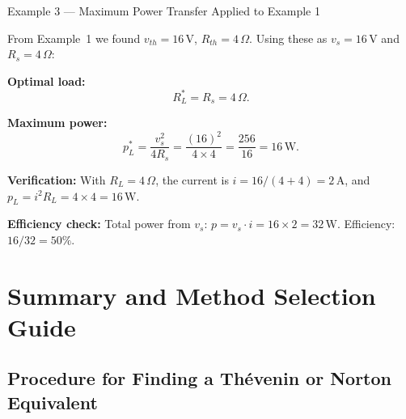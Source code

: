 \documentclass[twoside]{article}
\begin{document}
\begin{greenbox}{}{Example 3 — Maximum Power Transfer Applied to Example 1}

From Example~1 we found $v_{th} = 16\,\mathrm{V}$, $R_{th} = 4\,\Omega$.  Using these as $v_s = 16\,\mathrm{V}$ and $R_s = 4\,\Omega$:

\textbf{Optimal load:}
\[
    R_L^{*} = R_s = 4\,\Omega.
\]

\textbf{Maximum power:}
\[
    p_L^{*} = \frac{v_s^2}{4R_s} = \frac{(16)^2}{4 \times 4} = \frac{256}{16} = 16\,\mathrm{W}.
\]

\textbf{Verification:} With $R_L = 4\,\Omega$, the current is $i = 16/(4+4) = 2\,\mathrm{A}$, and $p_L = i^2 R_L = 4 \times 4 = 16\,\mathrm{W}$. \checkmark

\textbf{Efficiency check:} Total power from $v_s$: $p = v_s \cdot i = 16 \times 2 = 32\,\mathrm{W}$.
Efficiency: $16/32 = 50\%$. \checkmark
\end{greenbox}

\section{Summary and Method Selection Guide}

\subsection{Procedure for Finding a Th\'{e}venin or Norton Equivalent}
\end{document}
